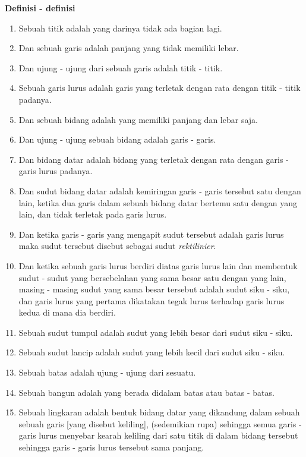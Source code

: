 \documentclass[a4paper]{book}
\begin{document}
\begin{center}
\textbf{Definisi - definisi}
\end{center} 
\begin{enumerate}
\item Sebuah titik adalah yang darinya tidak ada bagian lagi.
\item Dan sebuah garis adalah panjang yang tidak memiliki lebar.
\item Dan ujung - ujung dari sebuah garis adalah titik - titik.
\item Sebuah garis lurus adalah garis yang terletak dengan rata dengan titik - titik padanya.
\item Dan sebuah bidang adalah yang memiliki panjang dan lebar saja.
\item Dan ujung - ujung sebuah bidang adalah garis - garis.
\item Dan bidang datar adalah bidang yang terletak dengan rata dengan garis - garis lurus padanya.
\item Dan sudut bidang datar adalah kemiringan garis - garis tersebut 
satu dengan lain, ketika dua garis dalam sebuah bidang datar bertemu satu dengan
yang lain, dan tidak terletak pada garis lurus.
\item Dan ketika garis - garis yang mengapit sudut tersebut adalah garis lurus maka sudut
tersebut disebut sebagai sudut \textit{rektilinier}.
\item Dan ketika sebuah garis lurus berdiri diatas garis lurus lain dan 
membentuk sudut - sudut yang bersebelahan yang sama besar satu dengan yang 
lain, masing - masing sudut yang sama besar tersebut adalah sudut siku - siku,
dan garis lurus yang pertama dikatakan tegak lurus terhadap garis lurus kedua
di mana dia berdiri.
\item Sebuah sudut tumpul adalah sudut yang lebih besar dari sudut siku - siku.
\item Sebuah sudut lancip adalah sudut yang lebih kecil dari sudut siku - siku.
\item Sebuah batas adalah ujung - ujung dari sesuatu.
\item Sebuah bangun adalah yang berada didalam batas atau batas - batas.
\item Sebuah lingkaran adalah bentuk bidang datar yang dikandung dalam sebuah 
sebuah garis [yang disebut keliling], (sedemikian rupa) sehingga semua 
garis - garis lurus menyebar kearah keliling dari satu titik di dalam bidang
tersebut sehingga garis - garis lurus tersebut sama panjang.

\end{enumerate}
\end{document}
